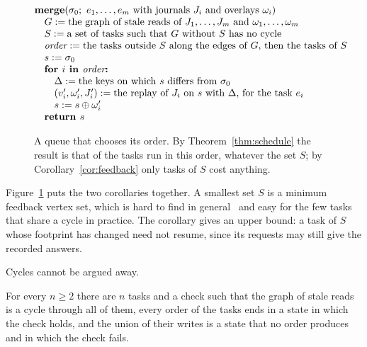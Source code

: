 \documentclass[acmsmall,nonacm,screen]{acmart}
\newcommand{\upd}{\oplus}
\begin{document}
\begin{figure}[t]
\[
\begin{array}{@{}l@{}}
\textbf{merge}(\sigma_0;\ e_1, \ldots, e_m \text{ with journals } J_i \text{ and overlays } \omega_i)\\
\quad G := \text{the graph of stale reads of } J_1, \ldots, J_m \text{ and } \omega_1, \ldots, \omega_m\\
\quad S := \text{a set of tasks such that $G$ without $S$ has no cycle}\\
\quad \textit{order} := \text{the tasks outside $S$ along the edges of $G$, then the tasks of $S$}\\
\quad s := \sigma_0\\
\quad \textbf{for } i \textbf{ in } \textit{order}\textbf{:}\\
\qquad \Delta := \text{the keys on which $s$ differs from $\sigma_0$}\\
\qquad (v_i', \omega_i', J_i') := \text{the replay of $J_i$ on $s$ with $\Delta$, for the task $e_i$}\\
\qquad s := s \upd \omega_i'\\
\quad \textbf{return } s
\end{array}
\]
\caption{A queue that chooses its order. By Theorem~\ref{thm:schedule} the result is that of
the tasks run in this order, whatever the set $S$; by Corollary~\ref{cor:feedback} only tasks
of $S$ cost anything.}
\label{fig:queue}
\end{figure}

Figure~\ref{fig:queue} puts the two corollaries together. A smallest set $S$ is a minimum
feedback vertex set, which is hard to find in general~\citep{karp1972} and easy for the few
tasks that share a cycle in practice. The
corollary gives an upper bound: a task of $S$ whose footprint has changed need not resume,
since its requests may still give the recorded answers.

Cycles cannot be argued away.

\begin{proposition}
\label{prop:cycle}
For every $n \ge 2$ there are $n$ tasks and a check such that the graph of stale reads is a
cycle through all of them, every order of the tasks ends in a state in which the check
holds, and the union of their writes is a state that no order produces and in which the
check fails.
\end{proposition}
\end{document}
